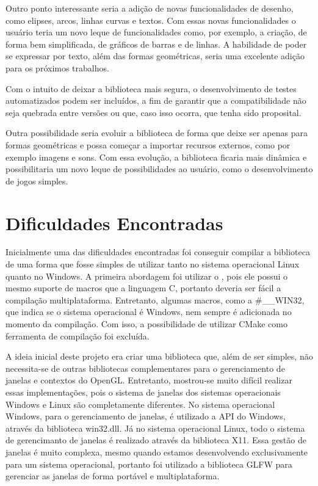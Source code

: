 \documentclass[12pt, %
openright,
oneside, %
a4paper,    %
brazil]{facom-ufu-abntex2}
\begin{document}
Outro ponto interessante seria a adição de novas funcionalidades de desenho, como elipses, arcos, linhas curvas e textos. Com essas novas funcionalidades o usuário teria um novo leque de funcionalidades como, por exemplo, a criação, de forma bem simplificada, de gráficos de barras e de linhas. A habilidade de poder se expressar por texto, além das formas geométricas, seria uma excelente adição para os próximos trabalhos.

Com o intuito de deixar a biblioteca mais segura, o desenvolvimento de testes automatizados podem ser incluídos, a fim de garantir que a compatibilidade não seja quebrada entre versões ou que, caso isso ocorra, que tenha sido proposital.

Outra possibilidade seria evoluir a biblioteca de forma que deixe ser apenas para formas geométricas e possa começar a importar recursos externos, como por exemplo imagens e sons. Com essa evolução, a biblioteca ficaria mais dinâmica e possibilitaria um novo leque de possibilidades ao usuário, como o desenvolvimento de jogos simples.

\section{Dificuldades Encontradas}
Inicialmente uma das dificuldades encontradas foi conseguir compilar a biblioteca de uma forma que fosse simples de utilizar tanto no sistema operacional Linux quanto no Windows. A primeira abordagem foi utilizar o , pois ele possui o mesmo suporte de macros que a linguagem C, portanto deveria ser fácil a compilação multiplataforma. Entretanto, algumas macros, como a \#\_\_WIN32, que indica se o sistema operacional é Windows, nem sempre é adicionada no momento da compilação. Com isso, a possibilidade de utilizar CMake como ferramenta de compilação foi excluída.

A ideia inicial deste projeto era criar uma biblioteca que, além de ser simples, não necessita-se de outras bibliotecas complementares para o gerenciamento de janelas e contextos do OpenGL. Entretanto, mostrou-se muito difícil realizar essas implementações, pois o sistema de janelas dos sistemas operacionais Windows e Linux são completamente diferentes. No sistema operacional Windows, para o gerenciamento de janelas, é utilizado a API do Windows, através da biblioteca win32.dll. Já no sistema operacional Linux, todo o sistema de gerencimanto de janelas é realizado através da biblioteca X11. Essa gestão de janelas é muito complexa, mesmo quando estamos desenvolvendo exclusivamente para um sistema operacional, portanto foi utilizado a biblioteca GLFW para gerenciar as janelas de forma portável e multiplataforma.
\end{document}
